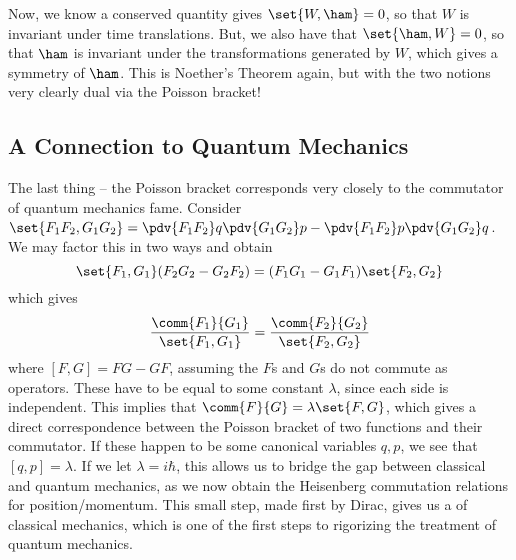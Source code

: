 \documentclass[12pt]{article}
\begin{document}
Now, we know a conserved quantity gives $\set{W, \ham} = 0$, so that $W$ is
invariant under time translations. But, we also have that $\set{\ham, W} = 0$,
so that $\ham$ is invariant under the transformations generated by $W$, which gives
a symmetry of $\ham$. This is Noether's Theorem again, but with the two notions
very clearly dual via the Poisson bracket!



\subsection{A Connection to Quantum Mechanics}
The last thing -- the Poisson bracket corresponds very closely to the commutator
of quantum mechanics fame. Consider $\set{F_1F_2, G_1G_2} = \pdv{F_1 F_2}q
\pdv{G_1 G_2}p - \pdv{F_1 F_2}p \pdv{G_1 G_2}q$. We may factor this in two ways and obtain 
\[
  \set{F_1, G_1}(F_2G_2-G_2F_2) = (F_1G_1-G_1F_1)\set{F_2, G_2}
\]
which gives 
\[
  \frac{\comm{F_1}{G_1}}{\set{F_1, G_1}} = \frac{\comm{F_2}{G_2}}{\set{F_2, G_2}}
\]
where $[F, G] = FG - GF$, assuming the $F$s and $G$s do not commute as operators. 
These have to be equal to some constant $\lambda$, since each side is
independent. This implies that $\comm{F}{G} = \lambda \set{F, G}$, which gives a
direct correspondence between the Poisson bracket of two functions and their
commutator. If these happen to be some canonical variables $q, p$, we see that 
$[q, p] = \lambda. $
If we let $\lambda = i\hbar$, this allows us to bridge the gap between classical
and quantum mechanics, as we now obtain the Heisenberg commutation relations for
position/momentum.
This small step, made first by Dirac, gives us a  of classical mechanics, which is one of the first steps to rigorizing the treatment of quantum mechanics. 
\end{document}
